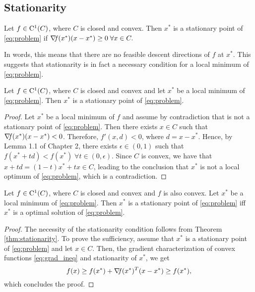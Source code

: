 \documentclass[10pt,a4paper]{article}
\begin{document}
\subsection{Stationarity}
\begin{definition}
	Let $f\in \mathord{\mathrm{C^1}}(C)$, where $C$ is closed and convex. Then $x^*$ is a stationary point of \eqref{eq:problem} if $\operatorname*{\mathit{\nabla \!f}}(x^*)(x-x^*)\geq 0 \; \forall x\in C.$ 
\end{definition}
\noindent In words, this means that there are no feasible descent directions of $f$ at $x^*$. This suggests that stationarity is in fact a necessary condition for a local minimum of \eqref{eq:problem}.
\begin{theorem}\label{thm:stationarity}
	Let $f\in \mathord{\mathrm{C^1}}(C)$, where $C$ is closed and convex and let $x^*$ be a local minimum of \eqref{eq:problem}. Then $x^*$ is a stationary point of \eqref{eq:problem}.
\end{theorem}
\begin{proof}
	Let $x^*$ be a local minimum of $f$ and assume by contradiction that is not a stationary point of \eqref{eq:problem}. Then there exists $x\in C$ such that $\operatorname*{\mathit{\nabla \!f}}(x^*)(x-x^*)< 0$. Therefore, $f'(x,d)<0$, where $d=x-x^*$. Hence, by Lemma 1.1 of Chapter 2, there exists $\epsilon\in(0,1)$ such that $f(x^*+td)<f(x^*)\;\forall t\in(0,\epsilon).$ Since $C$ is convex, we have that $x+td = (1-t)x^*+tx\in C$, leading to the conclusion that $x^*$ is not a local optimum of \eqref{eq:problem}, which is a contradiction.
\end{proof}

\begin{theorem}
	Let $f\in \mathord{\mathrm{C^1}}(C)$, where $C$ is closed and convex and $f$ is also convex. Let $x^*$ be a local minimum of \eqref{eq:problem}. Then $x^*$ is a stationary point of \eqref{eq:problem} iff $x^*$ is a optimal solution of \eqref{eq:problem}.
\end{theorem}
\begin{proof}
	The necessity of the stationarity condition follows from Theorem \ref{thm:stationarity}. To prove the sufficiency, assume that $x^*$ is a stationary point of \eqref{eq:problem} and let $x\in C$. Then, the gradient characterization of convex functions \eqref{eq:grad_ineq} and stationarity of $x^*$, we get
	\begin{equation*}
		f(x) \geq f(x^*) +\operatorname*{\mathit{\nabla \!f}}(x^*)^T(x-x^*) \geq f(x^*),
	\end{equation*}
which concludes the proof.
\end{proof}



\end{document}
